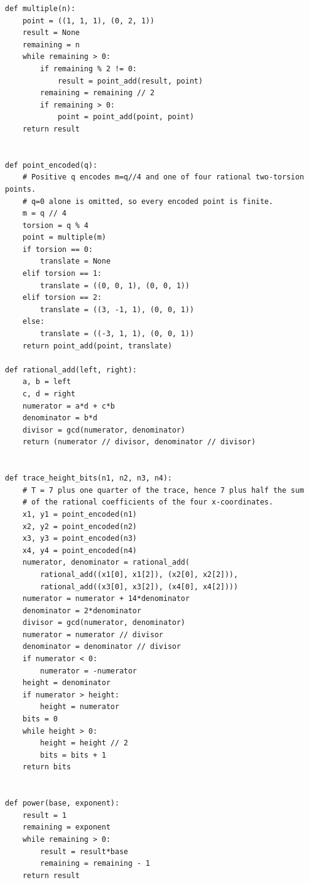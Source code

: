 \begin{verbatim}
def multiple(n):
    point = ((1, 1, 1), (0, 2, 1))
    result = None
    remaining = n
    while remaining > 0:
        if remaining % 2 != 0:
            result = point_add(result, point)
        remaining = remaining // 2
        if remaining > 0:
            point = point_add(point, point)
    return result


def point_encoded(q):
    # Positive q encodes m=q//4 and one of four rational two-torsion points.
    # q=0 alone is omitted, so every encoded point is finite.
    m = q // 4
    torsion = q % 4
    point = multiple(m)
    if torsion == 0:
        translate = None
    elif torsion == 1:
        translate = ((0, 0, 1), (0, 0, 1))
    elif torsion == 2:
        translate = ((3, -1, 1), (0, 0, 1))
    else:
        translate = ((-3, 1, 1), (0, 0, 1))
    return point_add(point, translate)

def rational_add(left, right):
    a, b = left
    c, d = right
    numerator = a*d + c*b
    denominator = b*d
    divisor = gcd(numerator, denominator)
    return (numerator // divisor, denominator // divisor)


def trace_height_bits(n1, n2, n3, n4):
    # T = 7 plus one quarter of the trace, hence 7 plus half the sum
    # of the rational coefficients of the four x-coordinates.
    x1, y1 = point_encoded(n1)
    x2, y2 = point_encoded(n2)
    x3, y3 = point_encoded(n3)
    x4, y4 = point_encoded(n4)
    numerator, denominator = rational_add(
        rational_add((x1[0], x1[2]), (x2[0], x2[2])),
        rational_add((x3[0], x3[2]), (x4[0], x4[2])))
    numerator = numerator + 14*denominator
    denominator = 2*denominator
    divisor = gcd(numerator, denominator)
    numerator = numerator // divisor
    denominator = denominator // divisor
    if numerator < 0:
        numerator = -numerator
    height = denominator
    if numerator > height:
        height = numerator
    bits = 0
    while height > 0:
        height = height // 2
        bits = bits + 1
    return bits


def power(base, exponent):
    result = 1
    remaining = exponent
    while remaining > 0:
        result = result*base
        remaining = remaining - 1
    return result



\end{verbatim}
